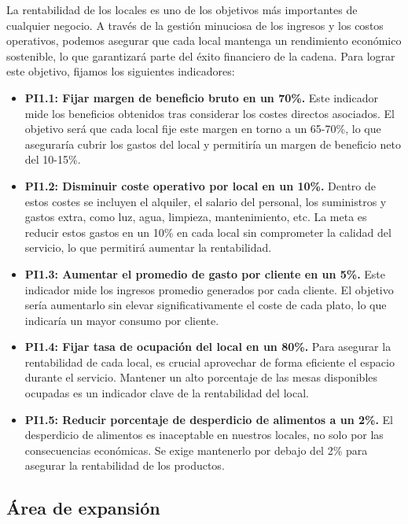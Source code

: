 \documentclass[12pt]{opticajnl}
\begin{document}
La rentabilidad de los locales es uno de los objetivos más importantes de cualquier negocio. A través de la gestión minuciosa de los ingresos y los costos operativos, podemos asegurar que cada local mantenga un rendimiento económico sostenible, lo que garantizará parte del éxito financiero de la cadena. Para lograr este objetivo, fijamos los siguientes indicadores:

\begin{itemize}
    \item \textbf{PI1.1: Fijar margen de beneficio bruto en un 70\%.} Este indicador mide los beneficios obtenidos tras considerar los costes directos asociados. El objetivo será que cada local fije este margen en torno a un 65-70\%, lo que aseguraría cubrir los gastos del local y permitiría un margen de beneficio neto del 10-15\%. 
    \item \textbf{PI1.2: Disminuir coste operativo por local en un 10\%.} Dentro de estos costes se incluyen el alquiler, el salario del personal, los suministros y gastos extra, como luz, agua, limpieza, mantenimiento, etc. La meta es reducir estos gastos en un 10\% en cada local sin comprometer la calidad del servicio, lo que permitirá aumentar la rentabilidad.
    \item \textbf{PI1.3: Aumentar el promedio de gasto por cliente en un 5\%.} Este indicador mide los ingresos promedio generados por cada cliente. El objetivo sería aumentarlo sin elevar significativamente el coste de cada plato, lo que indicaría un mayor consumo por cliente. 
    \item \textbf{PI1.4: Fijar tasa de ocupación del local en un 80\%.} Para asegurar la rentabilidad de cada local, es crucial aprovechar de forma eficiente el espacio durante el servicio. Mantener un alto porcentaje de las mesas disponibles ocupadas es un indicador clave de la rentabilidad del local.
    \item \textbf{PI1.5: Reducir porcentaje de desperdicio de alimentos a un 2\%.} El desperdicio de alimentos es inaceptable en nuestros locales, no solo por las consecuencias económicas. Se exige mantenerlo por debajo del 2\% para asegurar la rentabilidad de los productos. 
\end{itemize}






\subsection{Área de expansión}
\end{document}
